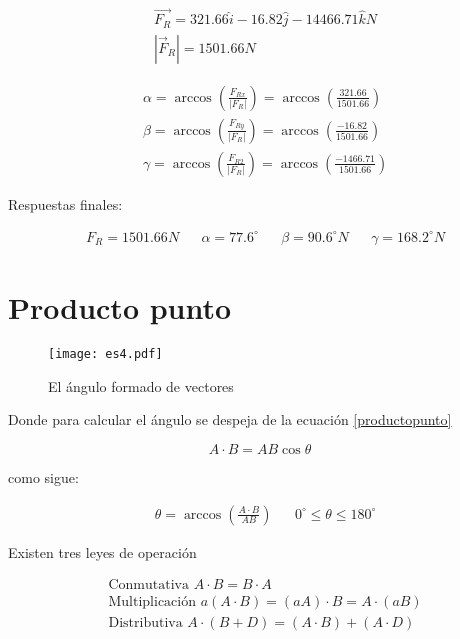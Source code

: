 \begin{align*}
	 & \overrightarrow{F_R}=321.66\hat{i}-16.82\hat{j}-14466.71\hat{k}N \\
	 & \left\lvert \overrightarrow{F}_R \right\rvert=1501.66N
\end{align*}

\begin{align*}
	 & \alpha=\arccos{\left(\frac{F_{Rx}}{\left\lvert F_R\right\rvert}\right)}=\arccos{\left(\frac{321.66}{1501.66}\right)} \\&\beta=\arccos{\left(\frac{F_{Ry}}{\left\lvert F_R\right\rvert}\right)}=\arccos{\left(\frac{-16.82}{1501.66}\right)}\\&\gamma=\arccos{\left(\frac{F_{R2}}{\left\lvert F_R\right\rvert}\right)}=\arccos{\left(\frac{-1466.71}{1501.66}\right)}
\end{align*}

Respuestas finales:

\begin{align*}
	 & F_R=1501.66N &  & \alpha=77.6^{\circ} &  & \beta=90.6^{\circ}N &  & \gamma=168.2^{\circ}N
\end{align*}


\section{Producto punto}

\begin{figure}[h!]
	\centering
	\texttt{[image: es4.pdf]}
	\caption{El ángulo formado de vectores}
	\label{es4pdf}
\end{figure}

Donde para calcular el ángulo se despeja de la ecuación \ref{productopunto}

\begin{equation}
	A\cdot B=AB\cos\theta
	\label{productopunto}
\end{equation}

como sigue:

\begin{align*}
	 & \theta=\arccos \left(\frac{A\cdot B}{AB}\right) &  & 0^{\circ}\leq\theta \leq 180^{\circ}
\end{align*}

Existen tres leyes de operación

\begin{align}
	 & \text{Conmutativa } A\cdot B=B\cdot A                      \\
	 & \text{Multiplicación } a(A\cdot B)= (aA)\cdot B=A\cdot(aB) \\
	 & \text{Distributiva } A\cdot (B+D)=(A\cdot B)+(A\cdot D)
\end{align}


